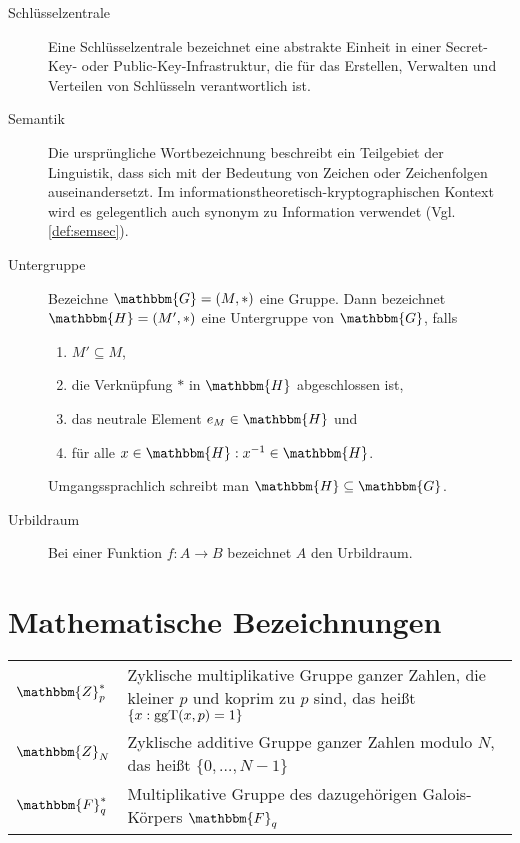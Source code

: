 \begin{description}
	\item[Schlüsselzentrale] Eine Schlüsselzentrale bezeichnet eine abstrakte Einheit in einer Secret-Key- oder Public-Key-Infrastruktur, die für das
	Erstellen, Verwalten und Verteilen von Schlüsseln verantwortlich ist.
	\item[Semantik] Die ursprüngliche Wortbezeichnung beschreibt ein Teilgebiet der Linguistik, dass sich mit der Bedeutung von Zeichen oder Zeichenfolgen
	auseinandersetzt. Im informationstheoretisch-kryptographischen Kontext wird es gelegentlich auch synonym zu Information verwendet (Vgl. 
	\ref{def:semsec}).
	\item[Untergruppe] Bezeichne $\mathbbm{G} = (M, \ast)$ eine Gruppe. Dann bezeichnet $\mathbbm{H} = (M', \ast)$ eine Untergruppe von $\mathbbm{G}$,
	falls
	\begin{enumerate}
		\item $M' \subseteq M$,
		\item die Verknüpfung $\ast$ in $\mathbbm{H}$ abgeschlossen ist,
		\item das neutrale Element $e_M \in \mathbbm{H}$ und
		\item für alle $x \in \mathbbm{H} : x^{-1} \in \mathbbm{H}$.
	\end{enumerate}
	Umgangssprachlich schreibt man $\mathbbm{H} \subseteq \mathbbm{G}$.
	\item[Urbildraum] Bei einer Funktion $f\colon A \rightarrow B$ bezeichnet $A$ den Urbildraum.
\end{description}

\renewcommand{\arraystretch}{1.5}
\section{Mathematische Bezeichnungen}
\begin{tabularx}{\textwidth}{ p{} | X }
	$\mathbbm{Z}^{\ast}_p$ & Zyklische multiplikative Gruppe ganzer Zahlen, die kleiner $p$ und koprim zu $p$ sind, das heißt $\{x : \operatorname{ggT}(x, p) = 1\}$\\
	$\mathbbm{Z}_N$ & Zyklische additive Gruppe ganzer Zahlen modulo $N$, das heißt ${\{0, \dots, N-1\}}$\\
	$\mathbbm{F}^{\ast}_q$ & Multiplikative Gruppe des dazugehörigen Galois-Körpers $\mathbbm{F}_q$
\end{tabularx}

